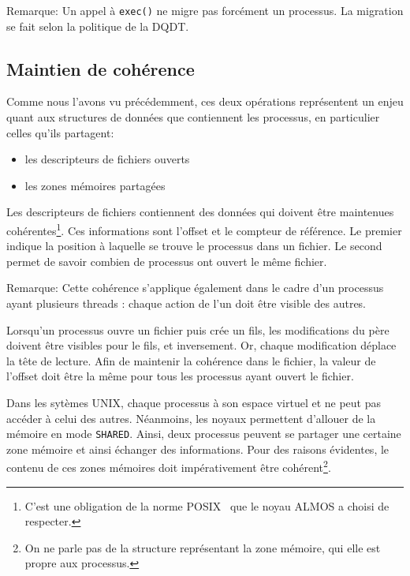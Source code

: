         \begin{paragraph}{Remarque:}
          Un appel à \texttt{exec()} ne migre pas forcément un processus. La
          migration se fait selon la politique de la DQDT.
        \end{paragraph}


    \subsection{Maintien de cohérence}

      Comme nous l'avons vu précédemment, ces deux opérations représentent un
      enjeu quant aux structures de données que contiennent les processus, en
      particulier celles qu'ils partagent:
      \begin{itemize}
      \item les descripteurs de fichiers ouverts
      \item les zones mémoires partagées
      \end{itemize}

      Les descripteurs de fichiers contiennent des données qui doivent être
      maintenues cohérentes\footnote{C'est une obligation de la norme
        POSIX~\citep{posix2013} que le noyau ALMOS a choisi de respecter.}. Ces
      informations sont l'offset et le compteur de référence. Le premier indique
      la position à laquelle se trouve le processus dans un fichier. Le second
      permet de savoir combien de processus ont ouvert le même fichier.

      \begin{paragraph}{Remarque:}
        Cette cohérence s'applique également dans le cadre d'un processus ayant
        plusieurs threads : chaque action de l'un doit être visible des
        autres.\\
      \end{paragraph}

      Lorsqu'un processus ouvre un fichier puis crée un fils, les modifications
      du père doivent être visibles pour le fils, et inversement. Or, chaque
      modification déplace la tête de lecture. Afin de maintenir la cohérence
      dans le fichier, la valeur de l'offset doit être la même pour tous les
      processus ayant ouvert le fichier.

      Dans les sytèmes UNIX, chaque processus à son espace virtuel et ne peut
      pas accéder à celui des autres. Néanmoins, les noyaux permettent d'allouer
      de la mémoire en mode \texttt{SHARED}. Ainsi, deux processus peuvent se
      partager une certaine zone mémoire et ainsi échanger des
      informations. Pour des raisons évidentes, le contenu de ces zones mémoires
      doit impérativement être cohérent\footnote{On ne parle pas de la structure
        représentant la zone mémoire, qui elle est propre aux processus.}.


